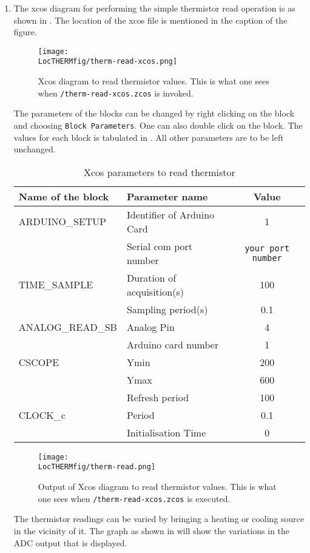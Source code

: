 \begin{enumerate}
\item The xcos diagram for performing the simple thermistor read operation is as shown in . The location of the xcos file is mentioned in the caption of the figure.
\begin{figure}
    \centering
    \texttt{[image: \\LocTHERMfig/therm-read-xcos.png]}
    \caption[Xcos diagram to read thermistor values]{Xcos diagram to read thermistor values.  
      This is what one sees when 
      {\tt \LocTHERMscibrief/therm-read-xcos.zcos} is invoked.}
    \label{fig:therm-read}
  \end{figure}
The parameters of the blocks can be changed by right clicking on the block and choosing {\tt Block Parameters}. One can also double click on the block. The values for each block is tabulated in .  All other parameters are to
  be left unchanged.

\begin{table}
    \centering
    \caption{Xcos parameters to read thermistor}
    \label{tab:therm-read}
    \begin{tabular}{llc} \hline
      Name of the block & Parameter name & Value \\ \hline
      ARDUINO\_SETUP & Identifier of Arduino Card & 1 \\
      & Serial com port number & {\tt your port number} \\ \hline
      TIME\_SAMPLE & Duration of acquisition(s) & 100 \\
      & Sampling period(s) & 0.1 \\ \hline
      ANALOG\_READ\_SB & Analog Pin & 4 \\
      & Arduino card number & 1 \\ \hline
      CSCOPE & Ymin & 200 \\ 
      & Ymax & 600 \\
      & Refresh period & 100 \\ \hline
      CLOCK\_c & Period & 0.1 \\
      & Initialisation Time & 0 \\ \hline
    \end{tabular}
  \end{table}
\begin{figure}
    \centering
    \texttt{[image: \\LocTHERMfig/therm-read.png]}
    \caption[Output of Xcos diagram to read thermistor values]{Output of Xcos diagram to read thermistor values.  
      This is what one sees when 
      {\tt \LocTHERMscibrief/therm-read-xcos.zcos} is executed.}
    \label{fig:therm-read-output}
  \end{figure}
The thermistor readings can be varied by bringing a heating or cooling source in the vicinity of it. The graph as shown in  will show the variations in the ADC output that is displayed.


\end{enumerate}
